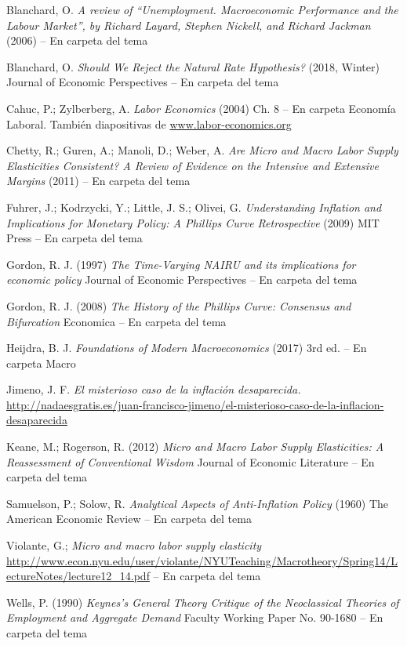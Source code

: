 \documentclass{nuevotema}
\begin{document}
Blanchard, O. \textit{A review of ``Unemployment. Macroeconomic Performance and the Labour Market'', by Richard Layard, Stephen Nickell, and Richard Jackman} (2006) -- En carpeta del tema

Blanchard, O. \textit{Should We Reject the Natural Rate Hypothesis?} (2018, Winter) Journal of Economic Perspectives -- En carpeta del tema

Cahuc, P.; Zylberberg, A. \textit{Labor Economics} (2004) Ch. 8 -- En carpeta Economía Laboral. También diapositivas de \url{www.labor-economics.org}

Chetty, R.; Guren, A.; Manoli, D.; Weber, A. \textit{Are Micro and Macro Labor Supply Elasticities Consistent? A Review of Evidence on the Intensive and Extensive Margins} (2011) -- En carpeta del tema

Fuhrer, J.; Kodrzycki, Y.; Little, J. S.; Olivei, G. \textit{Understanding Inflation and Implications for Monetary Policy: A Phillips Curve Retrospective} (2009) MIT Press -- En carpeta del tema

Gordon, R. J. (1997) \textit{The Time-Varying NAIRU and its implications for economic policy} Journal of Economic Perspectives -- En carpeta del tema

Gordon, R. J. (2008) \textit{The History of the Phillips Curve: Consensus and Bifurcation} Economica -- En carpeta del tema

Heijdra, B. J. \textit{Foundations of Modern Macroeconomics} (2017) 3rd ed. -- En carpeta Macro

Jimeno, J. F. \textit{El misterioso caso de la inflación desaparecida.} \url{http://nadaesgratis.es/juan-francisco-jimeno/el-misterioso-caso-de-la-inflacion-desaparecida}

Keane, M.; Rogerson, R. (2012) \textit{Micro and Macro Labor Supply Elasticities: A Reassessment of Conventional Wisdom} Journal of Economic Literature -- En carpeta del tema

Samuelson, P.; Solow, R. \textit{Analytical Aspects of Anti-Inflation Policy} (1960) The American Economic Review -- En carpeta del tema

Violante, G.; \textit{ Micro and macro labor supply elasticity} \url{http://www.econ.nyu.edu/user/violante/NYUTeaching/Macrotheory/Spring14/LectureNotes/lecture12_14.pdf} -- En carpeta del tema

Wells, P. (1990) \textit{Keynes's General Theory Critique of the Neoclassical Theories of Employment and Aggregate Demand} Faculty Working Paper No. 90-1680 -- En carpeta del tema
\end{document}

